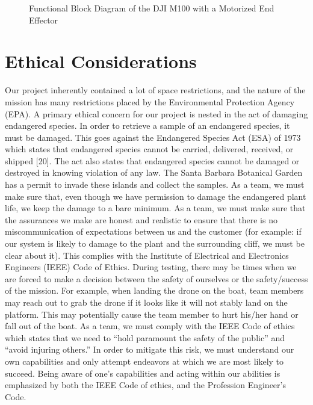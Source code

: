 \documentclass{wrcecapstone}
\begin{document}
\begin{figure}
\caption{Functional Block Diagram of the DJI M100 with a Motorized End Effector}
\end{figure}







\section{Ethical Considerations}

Our project inherently contained a lot of space restrictions, and the nature of the mission has many restrictions placed by the Environmental Protection Agency (EPA).  A primary ethical concern for our project is nested in the act of damaging endangered species.  In order to retrieve a sample of an endangered species, it must be damaged.  This goes against the Endangered Species Act (ESA) of 1973 which states that endangered species cannot be carried, delivered, received, or shipped [20].  The act also states that endangered species cannot be damaged or destroyed in knowing violation of any law.  The Santa Barbara Botanical Garden has a permit to invade these islands and collect the samples.  As a team, we must make sure that, even though we have permission to damage the endangered plant life, we keep the damage to a bare minimum.  As a team, we must make sure that the assurances we make are honest and realistic to ensure that there is no miscommunication of expectations between us and the customer (for example: if our system is likely to damage to  the plant and the surrounding cliff, we must be clear about it).  This complies with the Institute of Electrical and Electronics Engineers (IEEE) Code of Ethics.  During testing, there may be times when we are forced to make a decision between the safety of ourselves or the safety/success of the mission.  For example, when landing the drone on the boat, team members may reach out to grab the drone if it looks like it will not stably land on the platform.  This may potentially cause the team member to hurt his/her hand or fall out of the boat.  As a team, we must comply with the IEEE Code of ethics which states that we need to “hold paramount the safety of the public” and “avoid injuring others.”  In order to mitigate this risk, we must understand our own capabilities and only attempt endeavors at which we are most likely to succeed.  Being aware of one’s capabilities and acting within our abilities is emphasized by both the IEEE Code of ethics, and the Profession Engineer’s Code. 
\end{document}

